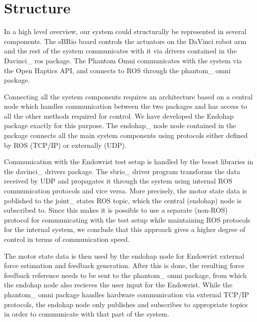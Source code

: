 
\section*{Structure}

In a high level overview, our system could structurally be represented in several components.
The sBRio board controls the actuators on the DaVinci robot arm and the rest of the system communicates with it via drivers contained in the Davinci\_ ros package. The Phantom Omni communicates with the system via the Open Haptics API, and connects to ROS through the phantom\_ omni package.

Connecting all the system components requires an architecture based on a central node which handles communication between the two packages and has access to all the other methods required for control.
We have developed the Endohap package exactly for this purpose.
The endohap\_ node node contained in the package connects all the main system components using protocols either defined by ROS (TCP/IP) or externally (UDP). 

Communication with the Endowrist test setup is handled by the boost libraries in the davinci\_ drivers package. 
The sbrio\_ driver program transforms the data received by UDP and propagates it through the system using internal ROS communication protocols and vice versa. 
More precisely, the motor state data is poblished to the joint\_ states ROS topic, which the central (endohap) node is subscribed to.
Since this makes it is possible to use a separate (non-ROS) protocol for communicating with the test setup while maintaining ROS protocols for the internal system, we conclude that this approach gives a higher degree of control in terms of communication speed.

The motor state data is then used by the endohap node for Endowrist external force estimation and feedback generation.
After this is done, the resulting force feedback reference needs to be sent to the phantom\_ omni package, from which the endohap node also recieves the user input for the Endowrist. While the phantom\_ omni package handles hardware communication via external TCP/IP protocols, the endohap node only publishes and subscribes to appropriate topics in order to communicate with that part of the system.

